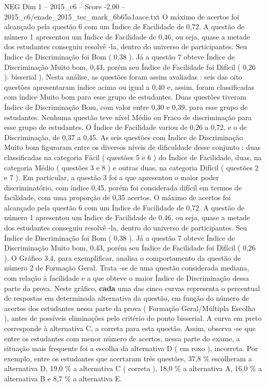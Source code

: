 \begin{textsample}{NEG Dim 1 – 2015\_c6 – Score -2.00 – 2015\_c6/enade\_2015\_tec\_mark\_6b65a1aace.txt}
O máximo de acertos foi alcançado pela questão 6 com um Índice de Facilidade de 0,72.
A questão de número 1 apresentou um Índice de Facilidade de 0,46, ou seja, quase a metade dos estudantes conseguiu resolvê -la, dentro do universo de participantes.
Seu Índice de Discriminação foi Bom ( 0,38 ).
Já a questão 7 obteve Índice de Discriminação Muito bom, 0,43, porém seu Índice de Facilidade foi Difícil ( 0,26 ). bisserial ).
Nesta análise, as questões foram assim avaliadas : seis das oito questões apresentaram índice acima ou igual a 0,40 e, assim, foram classificadas com índice Muito bom para esse grupo de estudantes.
Duas questões tiveram Índice de Discriminação Bom, com valor entre 0,30 e 0,39, para esse grupo de estudantes.
Nenhuma questão teve nível Médio ou Fraco de discriminação para esse grupo de estudantes.
O Índice de Facilidade variou de 0,26 a 0,72, e o de Discriminação, de 0,37 a 0,45.
As seis questões com Índice de Discriminação Muito bom figuraram entre os diversos níveis de dificuldade desse conjunto : duas classificadas na categoria Fácil ( questões 5 e 6 ) do Índice de Facilidade, duas, na categoria Médio ( questões 3 e 8 ) e outras duas, na categoria Difícil ( questões 2 e 7 ).
Em particular, a questão 3 foi a que apresentou o maior poder discriminatório, com índice 0,45, porém foi considerada difícil em termos de facilidade, com uma proporção de 0,35 acertos.
O máximo de acertos foi alcançado pela questão 6 com um Índice de Facilidade de 0,72.
A questão de número 1 apresentou um Índice de Facilidade de 0,46, ou seja, quase a metade dos estudantes conseguiu resolvê -la, dentro do universo de participantes.
Seu Índice de Discriminação foi Bom ( 0,38 ).
Já a questão 7 obteve Índice de Discriminação Muito bom, 0,43, porém seu Índice de Facilidade foi Difícil ( 0,26 ).
O Gráfico 3.4, para exemplificar, analisa o comportamento da questão de número 2 de Formação Geral.
Trata -se de uma questão considerada mediana, com relação à facilidade e a que obteve o maior Índice de Discriminação dessa parte da prova.
Neste gráfico, \textbf{cada} uma das cinco curvas representa o percentual de respostas em determinada alternativa da questão, em função do número de acertos dos estudantes nessa parte da prova ( Formação Geral/Múltipla Escolha ), antes de possíveis eliminações pelo critério do ponto bisserial.
A curva em preto corresponde à alternativa C, a correta para esta questão.
Assim, observa -se que entre os estudantes com menor número de acertos, nessa parte do exame, a situação mais frequente foi a escolha da alternativa D ( em roxo ), incorreta.
Por exemplo, entre os estudantes que acertaram três questões, 37,8 \% escolheram a alternativa D, 19,0 \% a alternativa C ( correta ), 18,0 \% a alternativa A, 16,0 \% a alternativa B e 8,7 \% a alternativa E.

\end{textsample}
